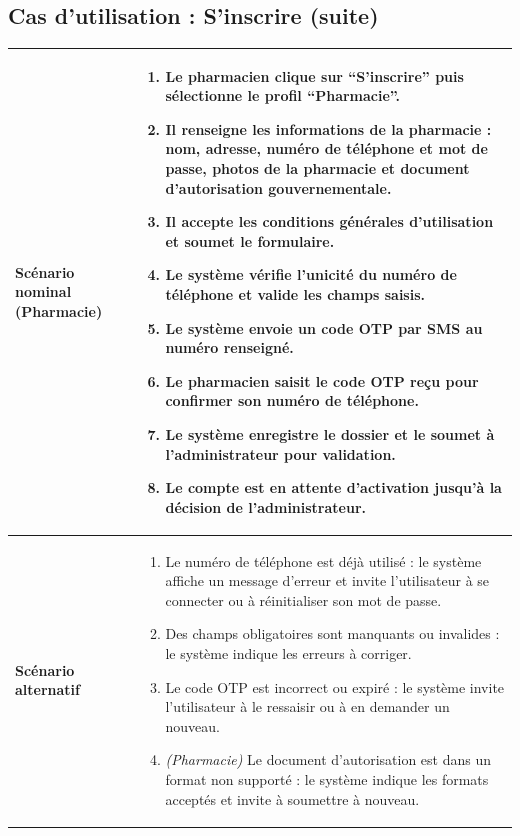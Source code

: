 \documentclass[12pt,a4paper]{report}
\begin{document}
\subsection*{Cas d'utilisation : S'inscrire (suite)}
\begin{table}[H]
    \centering
    \begin{tabular}{|p{4cm}|p{9cm}|}
    \hline
        \textbf{Scénario nominal (Pharmacie)} &
        \begin{enumerate}
            \item Le pharmacien clique sur \textbf{``S'inscrire''} puis sélectionne le profil \textbf{``Pharmacie''}.
            \item Il renseigne les informations de la pharmacie : nom, adresse, numéro de téléphone et mot de passe, photos de la pharmacie et document d'autorisation gouvernementale.
            \item Il accepte les conditions générales d'utilisation et soumet le formulaire.
            \item Le système vérifie l'unicité du numéro de téléphone et valide les champs saisis.
            \item Le système envoie un code OTP par SMS au numéro renseigné.
            \item Le pharmacien saisit le code OTP reçu pour confirmer son numéro de téléphone.
            \item Le système enregistre le dossier et le soumet à l'administrateur pour validation.
            \item Le compte est en attente d'activation jusqu'à la décision de l'administrateur.
        \end{enumerate} \\
        \hline
        \textbf{Scénario alternatif} &
        \begin{enumerate}
            \item[5.a] Le numéro de téléphone est déjà utilisé : le système affiche un message d'erreur et invite l'utilisateur à se connecter ou à réinitialiser son mot de passe.
            \item[5.b] Des champs obligatoires sont manquants ou invalides : le système indique les erreurs à corriger.
            \item[7.a] Le code OTP est incorrect ou expiré : le système invite l'utilisateur à le ressaisir ou à en demander un nouveau.
            \item[2.a] \textit{(Pharmacie)} Le document d'autorisation est dans un format non supporté : le système indique les formats acceptés et invite à soumettre à nouveau.

\end{enumerate}
\end{tabular}
\end{table}
\end{document}
